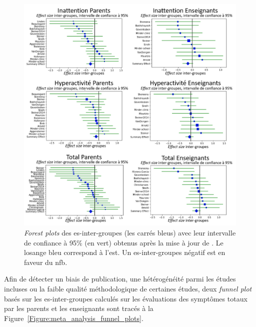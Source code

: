 \begin{figure}[h!]
  \centering
	\includegraphics[width=1\linewidth]{figures/chapter-2/meta-analysis-forest-plots} 
  \caption[\textit{Forest plots} de la mise à jour de \citet{Cortese2016}.]{\textit{Forest plots} des \gls{es}-inter-groupes (les carrés bleus) avec 
	leur intervalle de confiance à 95\% (en vert) obtenus après la mise à jour de 
	\citet{Cortese2016}. Le losange bleu correspond à l'\gls{est}.
	Un \gls{es}-inter-groupes négatif est en faveur du \gls{nfb}.}
  \label{Figure:meta_analysis_forest_plots}
\end{figure}

Afin de détecter un biais de publication, une hétérogénéité parmi les études incluses ou la faible qualité méthodologique de certaines études, 
deux \textit{funnel plot} basés sur les \gls{es}-inter-groupes calculés sur les évaluations des symptômes totaux par les parents et les enseignants sont 
tracés à la Figure~\ref{Figure:meta_analysis_funnel_plots}. 

